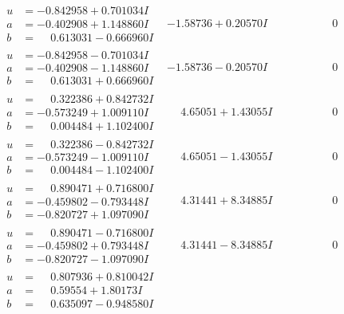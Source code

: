 \documentclass[1p]{elsarticle_modified}
\theoremstyle{definition}
\begin{document}
$$\begin{array}{c|c|c}
\begin{aligned}
u &= -0.842958 + 0.701034 I \\
a &= -0.402908 + 1.148860 I \\
b &= \phantom{-}0.613031 - 0.666960 I\end{aligned}
 & -1.58736 + 0.20570 I & \phantom{-0.000000 } 0 \\ \hline\begin{aligned}
u &= -0.842958 - 0.701034 I \\
a &= -0.402908 - 1.148860 I \\
b &= \phantom{-}0.613031 + 0.666960 I\end{aligned}
 & -1.58736 - 0.20570 I & \phantom{-0.000000 } 0 \\ \hline\begin{aligned}
u &= \phantom{-}0.322386 + 0.842732 I \\
a &= -0.573249 + 1.009110 I \\
b &= \phantom{-}0.004484 + 1.102400 I\end{aligned}
 & \phantom{-}4.65051 + 1.43055 I & \phantom{-0.000000 } 0 \\ \hline\begin{aligned}
u &= \phantom{-}0.322386 - 0.842732 I \\
a &= -0.573249 - 1.009110 I \\
b &= \phantom{-}0.004484 - 1.102400 I\end{aligned}
 & \phantom{-}4.65051 - 1.43055 I & \phantom{-0.000000 } 0 \\ \hline\begin{aligned}
u &= \phantom{-}0.890471 + 0.716800 I \\
a &= -0.459802 - 0.793448 I \\
b &= -0.820727 + 1.097090 I\end{aligned}
 & \phantom{-}4.31441 + 8.34885 I & \phantom{-0.000000 } 0 \\ \hline\begin{aligned}
u &= \phantom{-}0.890471 - 0.716800 I \\
a &= -0.459802 + 0.793448 I \\
b &= -0.820727 - 1.097090 I\end{aligned}
 & \phantom{-}4.31441 - 8.34885 I & \phantom{-0.000000 } 0 \\ \hline\begin{aligned}
u &= \phantom{-}0.807936 + 0.810042 I \\
a &= \phantom{-}0.59554 + 1.80173 I \\
b &= \phantom{-}0.635097 - 0.948580 I\end{aligned}

\end{array}$$
\end{document}
